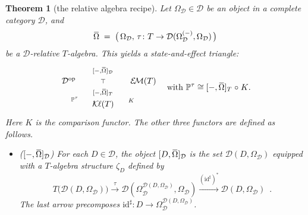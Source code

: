 \documentclass[9pt, preprint]{sigplanconf}
\theoremstyle{theorem}
\newtheorem{theorem}{Theorem}[section]
\theoremstyle{definition}
\newcommand{\cat}[1]{\mathcal{#1}}
\renewcommand{\bar}{\overbar}
\newcommand{\overbar}[1]{\mkern 1.5mu\overline{\mkern-1.5mu#1\mkern-1.5mu}\mkern 1.5mu}
\newcommand{\place}{{-}}
\newcommand{\op}{\mathrm{op}}
\newcommand{\id}{\mathrm{id}}
\newcommand{\EM}{\mathcal{E}{\kern-.5ex}\mathcal{M}}
\newcommand{\Kl}{\mathcal{K}{\kern-.2ex}\ell}
\newcommand{\OmegaD}{\Omega_{\cat{D}}}
\newcommand{\co}{\mathrel{\circ}}
\newcommand{\bbP}{\mathbb{P}}
\begin{document}
\begin{theorem}[the relative algebra recipe]
  \label{thm:state-effect-triangle-relative}
  Let $\OmegaD\in\cat{D}$ be an object in a complete category $\cat{D}$,
and
\begin{displaymath}
  \bar{\Omega} \;=\; \bigl(\,\OmegaD, \,\tau\colon T\to
  \cat{D}(\OmegaD^{(\place)}, \OmegaD)\,\bigr)
\end{displaymath}
be a $\cat{D}$-relative
 $T$-algebra.
 This yields a state-and-effect triangle:
  \begin{equation}\label{eq:state-effect-triagle-relative}
\vcenter{
 \xymatrix@R-1.2em@C-1em{
      \cat{D}^{\op} \ar@/^/[rr]^-{[\place, \bar{\Omega}]_\cat{D}}
        \ar@{}[rr]|-{\top}
      &&  \EM(T)\ar@/^/[ll]^-{[\place, \bar{\Omega}]_{T}} \\
      & \Kl(T) \ar@/^/[ul]^-{\bbP^{\tau}} \ar@/_/[ur]_-{K}
      & }
}
\quad\text{with $\bbP^{\tau} \cong [-, \bar{\Omega}]_{T} \co K$.}
  \end{equation}
Here $K$ is the comparison functor.
  The other three functors
are defined as follows.
\begin{itemize}
 \item ($[\place, \bar{\Omega}]_{\cat{D}}$)
 For each $D \in \cat{D}$,
  the object $[D, \bar{\Omega}]_{\cat{D}}$
  is the  set $\cat{D}(D, \OmegaD)$ equipped with
  a $T$-algebra structure
   $\zeta_D$  defined by
  \begin{equation}
    {T\bigl(\cat{D}(D, \OmegaD)\bigr)} \stackrel{\tau}{\to}
    \cat{D}(\OmegaD^{\cat{D}(D, \OmegaD)}, \OmegaD)
    \stackrel{(\id^{\sharp})^*}{\to}
    \cat{D}(D, \OmegaD) \enspace .
  \end{equation}
  The last arrow precomposes $\id^{\sharp}\colon D\to
       \OmegaD^{\cat{D}(D, \OmegaD)}$.


\end{itemize}
\end{theorem}
\end{document}
